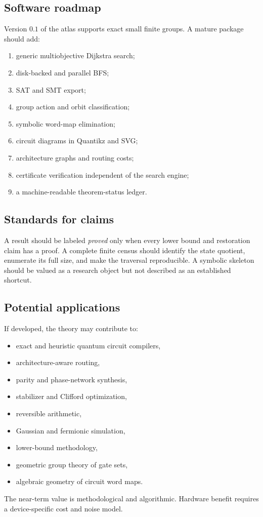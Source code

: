 \subsection{Software roadmap}
Version $0.1$ of the atlas supports exact small finite groups.  A mature package should add:
\begin{enumerate}
\item generic multiobjective Dijkstra search;
\item disk-backed and parallel BFS;
\item SAT and SMT export;
\item group action and orbit classification;
\item symbolic word-map elimination;
\item circuit diagrams in Quantikz and SVG;
\item architecture graphs and routing costs;
\item certificate verification independent of the search engine;
\item a machine-readable theorem-status ledger.
\end{enumerate}

\subsection{Standards for claims}
A result should be labeled \emph{proved} only when every lower bound and restoration claim has a proof.  A complete finite census should identify the state quotient, enumerate its full size, and make the traversal reproducible.  A symbolic skeleton should be valued as a research object but not described as an established shortcut.

\subsection{Potential applications}
If developed, the theory may contribute to:
\begin{itemize}
\item exact and heuristic quantum circuit compilers,
\item architecture-aware routing,
\item parity and phase-network synthesis,
\item stabilizer and Clifford optimization,
\item reversible arithmetic,
\item Gaussian and fermionic simulation,
\item lower-bound methodology,
\item geometric group theory of gate sets,
\item algebraic geometry of circuit word maps.
\end{itemize}
The near-term value is methodological and algorithmic.  Hardware benefit requires a device-specific cost and noise model.

